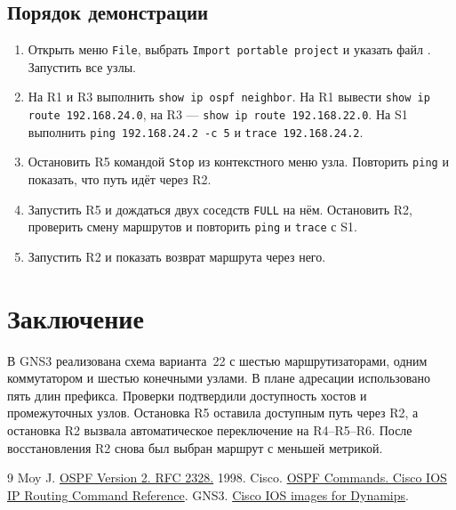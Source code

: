 \documentclass[a4paper,14pt]{extarticle}
\begin{document}
\clearpage
\subsection{Порядок демонстрации}

\begin{enumerate}
  \item Открыть меню \texttt{File}, выбрать \texttt{Import portable project}
    и указать файл . Запустить все узлы.
  \item На R1 и R3 выполнить \texttt{show ip ospf neighbor}. На R1
    вывести \texttt{show ip route 192.168.24.0}, на R3 ---
    \texttt{show ip route 192.168.22.0}. На S1 выполнить
    \texttt{ping 192.168.24.2 -c 5} и \texttt{trace 192.168.24.2}.
  \item Остановить R5 командой \texttt{Stop} из контекстного меню
    узла. Повторить \texttt{ping} и показать, что путь идёт через R2.
  \item Запустить R5 и дождаться двух соседств \texttt{FULL} на нём.
    Остановить R2, проверить смену маршрутов и повторить \texttt{ping}
    и \texttt{trace} с S1.
  \item Запустить R2 и показать возврат маршрута через него.
\end{enumerate}

\section{Заключение}

В GNS3 реализована схема варианта~22 с шестью маршрутизаторами,
одним коммутатором и шестью конечными узлами. В плане адресации
использовано пять длин префикса. Проверки подтвердили доступность
хостов и промежуточных узлов. Остановка R5 оставила доступным путь
через R2, а остановка R2 вызвала автоматическое переключение на
R4--R5--R6. После восстановления R2 снова был выбран
маршрут с меньшей метрикой.

{}
{\singlespacing\small
\begin{thebibliography}{9}
  \setlength{\itemsep}{0.25em}
    Moy J. \href{https://www.rfc-editor.org/rfc/rfc2328}{OSPF Version 2. RFC 2328.} 1998.
    Cisco. \href{https://www.cisco.com/c/en/us/td/docs/ios-xml/ios/iproute_ospf/command/iro-cr-book/ospf-a1.html}{OSPF Commands. Cisco IOS IP Routing Command Reference}.
    GNS3. \href{https://docs.gns3.com/docs/emulators/cisco-ios-images-for-dynamips}{Cisco IOS images for Dynamips}.
\end{thebibliography}
}
\end{document}

